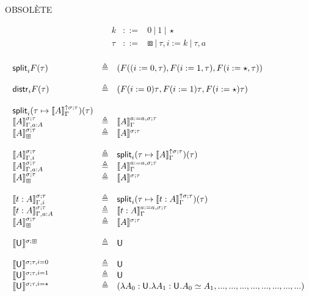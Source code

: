 \documentclass{article}
\newcommand{\emptyctx}{\boxbox}
\newcommand{\sort}[1]{\mathsf{U}_{#1}}
\newcommand{\defeq}{\triangleq}
\begin{document}
OBSOLÈTE

$$
\begin{array}{lcl}
k & ::= & 0 ~|~ 1 ~|~ \star \\
\tau & ::= & \emptyctx ~|~ \tau, i:=k ~|~ \tau, a\\
\end{array}
$$

$$
\begin{array}{lcl}
\incrstep{i}{\tau}{F} & \defeq &
  (F{((i:=0,\tau)},F{(i:=1,\tau)},F{(i:=\star,\tau)})\\
\\
\distrstep{i}{\tau}{F} & \defeq &
  (F{(i:=0)\tau},F{(i:=1)\tau},F{(i:=\star)\tau})\\
\\
  \incrstep{i}{\tau}{(\tau \mapsto \itsemtype{\Gamma}{\uparrow\sigma}{\tau}{A})}\\
\itsemtype{\Gamma,a:A}{\sigma}{\tau}{A} & \defeq &
  \itsemtype{\Gamma}{a:=a,\sigma}{\tau}{A}\\
\itsemtype{\emptyctx}{\sigma}{\tau}{A} & \defeq &
  \semtype{\sigma}{\tau}{A}\\
\\
\itsemtype{\Gamma,i}{\sigma}{\tau}{A} & \defeq &
  \incrstep{i}{\tau}{(\tau \mapsto \itsemtype{\Gamma}{\uparrow\sigma}{\tau}{A})}\\
\itsemtype{\Gamma,a:A}{\sigma}{\tau}{A} & \defeq &
  \itsemtype{\Gamma}{a:=a,\sigma}{\tau}{A}\\
\itsemtype{\emptyctx}{\sigma}{\tau}{A} & \defeq &
  \semtype{\sigma}{\tau}{A}\\
\\
\itsemterm{\Gamma,i}{\sigma}{\tau}{t:A} & \defeq &
  \incrstep{i}{\tau}{(\tau \mapsto \itsemterm{\Gamma}{\uparrow\sigma}{\tau}{t:A})}\\
\itsemterm{\Gamma,a:A}{\sigma}{\tau}{t:A} & \defeq &
  \itsemterm{\Gamma}{a:=a,\sigma}{\tau}{t:A}\\
\itsemterm{\emptyctx}{\sigma}{\tau}{A} & \defeq &
  \semterm{\sigma}{\tau}{A}\\
\\
\semtype{\sigma}{\emptyctx}{\sort{}} & \defeq &
  \sort{}\\
\\
\semtype{\sigma}{\tau,i=0}{\sort{}} & \defeq &
  \sort{}\\
\semtype{\sigma}{\tau,i=1}{\sort{}} & \defeq &
  \sort{}\\
\semtype{\sigma}{\tau,i=\star}{\sort{}} & \defeq &
  (\lambda A_0:\sort{}.\lambda A_1:\sort{}.A_0 \simeq A_1, ..., ..., ..., ..., ..., ..., ..., ...)\\

\end{array}$$
\end{document}
